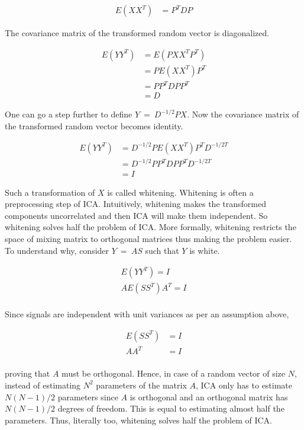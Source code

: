 \documentclass[11pt, a4paper]{article}
\begin{document}
\begin{align*}
	E(XX^T) & = P^TDP 
\end{align*}

The covariance matrix of the transformed random vector is diagonalized.

\begin{align*}
	E(YY^T) & = E(PXX^TP^T) \\
	        & = PE(XX^T)P^T \\
	        & = PP^TDPP^T   \\
	        & = D           
\end{align*}

One can go a step further to define $Y\ =\ D^{-1/2}PX$. Now the covariance matrix of the transformed random vector becomes identity.

\begin{align*}
	E(YY^T) & = D^{-1/2}PE(XX^T)P^TD^{-1/2T} \\
	        & = D^{-1/2}PP^TDPP^TD^{-1/2T}   \\
	        & = I                            
\end{align*}

Such a transformation of $X$ is called whitening. Whitening is often a preprocessing step of ICA. Intuitively, whitening makes the transformed components uncorrelated and then ICA will make them independent. So whitening solves half the problem of ICA. More formally, whitening restricts the space of mixing matrix to orthogonal matrices thus making the problem easier. To understand why, consider $Y\ =\  AS$ such that $Y$ is white.

\begin{align*}
	E(YY^T) = I      \\
	AE(SS^T) A^T = I \\
\end{align*}

Since signals are independent with unit variances as per an assumption above,

\begin{align*}
	E(SS^T) & = I \\
	AA^T    & = I \\
\end{align*}

proving that $A$ must be orthogonal. Hence, in case of a random vector of size $N$, instead of estimating $N^2$ parameters of the matrix $A$, ICA only has to estimate $N(N-1)/2$ parameters since $A$ is orthogonal and an orthogonal matrix has $N(N-1)/2$ degrees of freedom. This is equal to estimating almost half the parameters. Thus, literally too, whitening solves half the problem of ICA.
\end{document}
